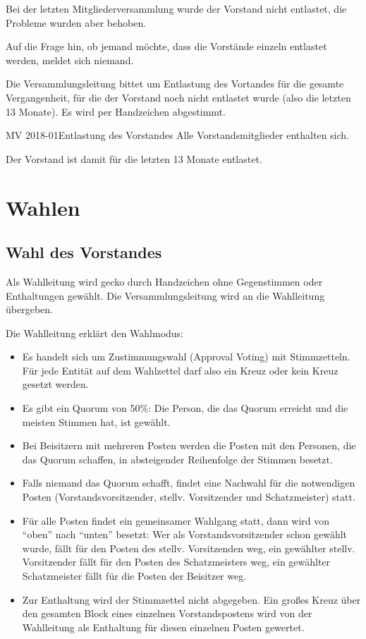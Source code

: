 \documentclass{s0minutes}
\begin{document}
Bei der letzten Mitgliederversammlung wurde der Vorstand nicht entlastet, die
Probleme wurden aber behoben.

Auf die Frage hin, ob jemand möchte, dass die Vorstände einzeln entlastet
werden, meldet sich niemand.

Die Versammlungsleitung bittet um Entlastung des Vortandes für die gesamte
Vergangenheit, für die der Vorstand noch nicht entlastet wurde (also die letzten
13 Monate). Es wird per Handzeichen abgestimmt.

\begin{resolution}{MV 2018-01}{}{Entlastung des
  Vorstandes}{}
  Alle Vorstandsmitglieder enthalten sich.
\end{resolution}

Der Vorstand ist damit für die letzten 13 Monate entlastet.

\section{Wahlen}

\subsection{Wahl des Vorstandes}

Als Wahlleitung wird gecko durch Handzeichen ohne Gegenstimmen oder
Enthaltungen gewählt. Die Versammlungsleitung wird an die Wahlleitung übergeben.

Die Wahlleitung erklärt den Wahlmodus:
\begin{itemize}
  \item Es handelt sich um Zustimmungswahl (Approval Voting) mit Stimmzetteln.
    Für jede Entität auf dem Wahlzettel darf also ein Kreuz oder kein Kreuz
    gesetzt werden.
  \item Es gibt ein Quorum von 50\%: Die Person, die das Quorum erreicht und die
    meisten Stimmen hat, ist gewählt.
  \item Bei Beisitzern mit mehreren Posten werden die Posten mit den Personen,
    die das Quorum schaffen, in absteigender Reihenfolge der Stimmen besetzt.
  \item Falls niemand das Quorum schafft, findet eine Nachwahl für die
    notwendigen Posten (Vorstandsvorsitzender, stellv. Vorsitzender und
    Schatzmeister) statt.
  \item Für alle Posten findet ein gemeinsamer Wahlgang statt, dann wird von
    "`oben"' nach "`unten"' besetzt: Wer als Vorstandsvorsitzender schon gewählt
    wurde, fällt für den Posten des stellv. Vorsitzenden weg, ein gewählter
    stellv. Vorsitzender fällt für den Posten des Schatzmeisters weg, ein
    gewählter Schatzmeister fällt für die Posten der Beisitzer weg.
  \item Zur Enthaltung wird der Stimmzettel nicht abgegeben. Ein großes Kreuz
    über den gesamten Block eines einzelnen Vorstandspostens wird von der
    Wahlleitung als Enthaltung für diesen einzelnen Posten gewertet.
\end{itemize}
\end{document}
